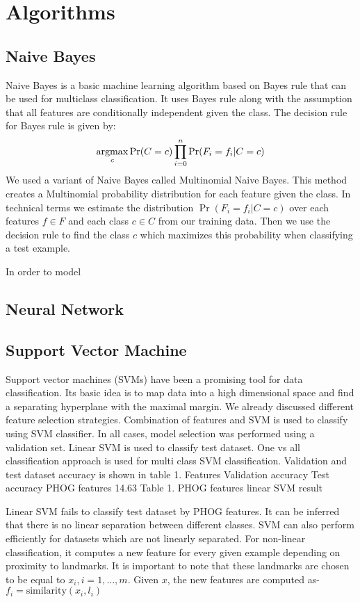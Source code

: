 \documentclass[10pt,twocolumn]{article}
\newcommand{\argmax}{\operatornamewithlimits{argmax}}
\begin{document}
\section{Algorithms}
\subsection{Naive Bayes}
Naive Bayes is a basic machine learning algorithm based on Bayes rule that can be used for multiclass classification. It uses Bayes rule along with the assumption that all features are conditionally independent given the class. The decision rule for Bayes rule is given by:
\[ \argmax_c \Pr(C = c) \prod_{i=0}^{n} \Pr(F_i = f_i | C = c)\]
We used a variant of Naive Bayes called Multinomial Naive Bayes. This method creates a Multinomial probability distribution for each feature given the class. In technical terms we estimate the distribution $\Pr(F_i = f_i | C = c)$ over each features $f \in F$ and each class $ c \in C$ from our training data. Then we use the decision rule to find the class $c$ which maximizes this probability when classifying a test example.

In order to model 
\subsection{Neural Network}
\subsection{Support Vector Machine}
Support vector machines (SVMs) have been a promising tool for data classification. Its basic idea is to map data into a high dimensional space and find a separating hyperplane with the maximal margin.
We already discussed different feature selection strategies. \cite {chen2006combining} Combination of features and SVM is used to classify using SVM classifier. In all cases, model selection was performed using a validation set. Linear SVM is used to classify test dataset. One vs all classification approach is used for multi class SVM classification. Validation and test dataset accuracy is shown in table 1.
Features	Validation accuracy	Test accuracy
PHOG features	14.63%
Table 1. PHOG features linear SVM result

Linear SVM fails to classify test dataset by PHOG features. It can be inferred that there is no linear separation between different classes.
SVM can also perform efficiently for datasets which are not linearly separated. For non-linear classification, it computes a new feature for every given example depending on proximity to landmarks. It is important to note that these landmarks are chosen to be equal to $x_i, i=1,…,m$. Given $x$, the new features are computed as-
$f_i=\text{similarity}(x_i,l_i)$
 
\end{document}
